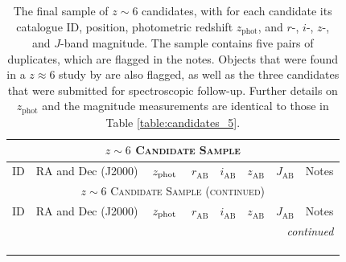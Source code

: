 {\begin{ThreePartTable}
\renewcommand\TPTminimum{\textwidth}
\setlength{\tabcolsep}{0.4em}
\doublespacing
\begin{longtable}{lccccccl}
\multicolumn{8}{c}{\textsc{$z\sim6$ Candidate Sample}}\\
\toprule\toprule 
ID & RA and Dec (J2000) & $\thickspace z_{\mathrm{phot}} \thickspace$ & $r_{\mathrm{AB}}$ & $i_{\mathrm{AB}}$ & $z_{\mathrm{AB}}$ & $J_{\mathrm{AB}}$ & Notes \\
\midrule
\endfirsthead
\multicolumn{8}{c}{\normalsize \textsc{$z\sim6$ Candidate Sample (continued)}}\\
\toprule\toprule 
ID & RA and Dec (J2000) & $\thickspace z_{\mathrm{phot}} \thickspace$ & $r_{\mathrm{AB}}$ & $i_{\mathrm{AB}}$ & $z_{\mathrm{AB}}$ & $J_{\mathrm{AB}}$ & Notes \\
\midrule
\endhead
\bottomrule
\multicolumn{8}{r}{\textit{continued}}
\endfoot
\midrule\midrule
\insertTableNotes \\
\bottomrule \\
\caption[Final \texorpdfstring{$z\sim6$}{} candidate sample]{The final sample of $z\sim6$ candidates, with for each candidate its catalogue ID, position, photometric redshift $z_{\mathrm{phot}}$, and $r$-, $i$-, $z$-, and $J$-band magnitude.  The sample contains five pairs of duplicates, which are flagged in the notes. Objects that were found in a $z\approx6$ study by \cite{2013AJ....145....4W} are also flagged, as well as the three candidates that were submitted for spectroscopic follow-up. Further details on $z_{\mathrm{phot}}$ and the magnitude measurements are identical to those in Table \ref{table:candidates_5}.  }\label{table:candidates_6}\\
\endlastfoot



\end{longtable}
\end{ThreePartTable}}
